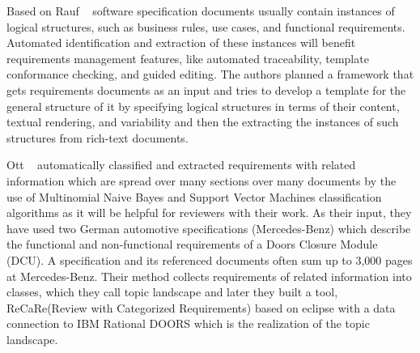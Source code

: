 Based on Rauf \etal~\cite{Rauf:2011} software specification documents usually contain instances of logical structures, such as business rules, use cases, and functional requirements. Automated identification and extraction of these instances will benefit requirements management features, like automated traceability, template conformance checking, and guided editing. The authors planned a framework that gets requirements documents as an input and tries to develop a template for the general structure of it by specifying logical structures in terms of their content, textual rendering, and variability and then the extracting the instances of such structures from rich-text documents. \newline

Ott \etal~\cite{Ott:2013} automatically classified and extracted requirements with related information which are spread over many sections over many documents by the use of Multinomial Naive Bayes and Support Vector Machines classification algorithms as it will be helpful for reviewers with their work. As their input, they have used two German automotive specifications (Mercedes-Benz) which describe the functional and non-functional requirements of a Doors Closure Module (DCU). A specification and its referenced documents often sum up to 3,000 pages at Mercedes-Benz. Their method collects requirements of related information into classes, which they call topic landscape and later they built a tool, ReCaRe(Review with Categorized Requirements) based on eclipse with a data connection to IBM Rational DOORS which is the realization of the topic landscape.





